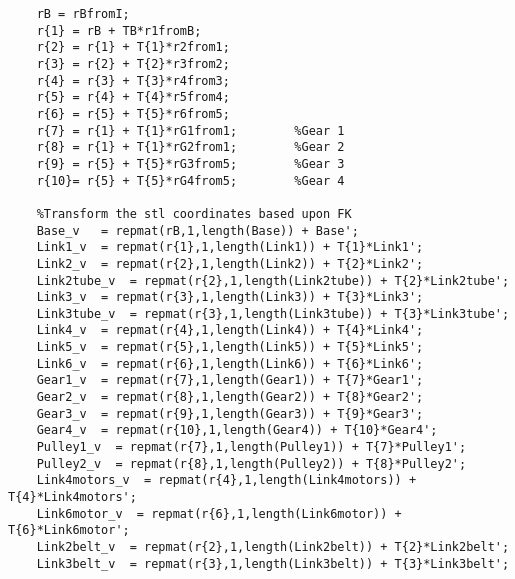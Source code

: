 \begin{lstlisting}[frame=lines,style=Matlab-editor,basicstyle = \mlttfamily, caption=MEIOSIS Drawing Function]
    %Positions wrt I
    rB = rBfromI;
    r{1} = rB + TB*r1fromB;
    r{2} = r{1} + T{1}*r2from1;
    r{3} = r{2} + T{2}*r3from2;
    r{4} = r{3} + T{3}*r4from3;
    r{5} = r{4} + T{4}*r5from4;
    r{6} = r{5} + T{5}*r6from5;
    r{7} = r{1} + T{1}*rG1from1;        %Gear 1
    r{8} = r{1} + T{1}*rG2from1;        %Gear 2
    r{9} = r{5} + T{5}*rG3from5;        %Gear 3
    r{10}= r{5} + T{5}*rG4from5;        %Gear 4

    %Transform the stl coordinates based upon FK
    Base_v   = repmat(rB,1,length(Base)) + Base';
    Link1_v  = repmat(r{1},1,length(Link1)) + T{1}*Link1';
    Link2_v  = repmat(r{2},1,length(Link2)) + T{2}*Link2';
    Link2tube_v  = repmat(r{2},1,length(Link2tube)) + T{2}*Link2tube';
    Link3_v  = repmat(r{3},1,length(Link3)) + T{3}*Link3';
    Link3tube_v  = repmat(r{3},1,length(Link3tube)) + T{3}*Link3tube';
    Link4_v  = repmat(r{4},1,length(Link4)) + T{4}*Link4';
    Link5_v  = repmat(r{5},1,length(Link5)) + T{5}*Link5';
    Link6_v  = repmat(r{6},1,length(Link6)) + T{6}*Link6';
    Gear1_v  = repmat(r{7},1,length(Gear1)) + T{7}*Gear1';
    Gear2_v  = repmat(r{8},1,length(Gear2)) + T{8}*Gear2';
    Gear3_v  = repmat(r{9},1,length(Gear3)) + T{9}*Gear3';
    Gear4_v  = repmat(r{10},1,length(Gear4)) + T{10}*Gear4';
    Pulley1_v  = repmat(r{7},1,length(Pulley1)) + T{7}*Pulley1';
    Pulley2_v  = repmat(r{8},1,length(Pulley2)) + T{8}*Pulley2';
    Link4motors_v  = repmat(r{4},1,length(Link4motors)) + T{4}*Link4motors';
    Link6motor_v  = repmat(r{6},1,length(Link6motor)) + T{6}*Link6motor';
    Link2belt_v  = repmat(r{2},1,length(Link2belt)) + T{2}*Link2belt';
    Link3belt_v  = repmat(r{3},1,length(Link3belt)) + T{3}*Link3belt';


\end{lstlisting}

